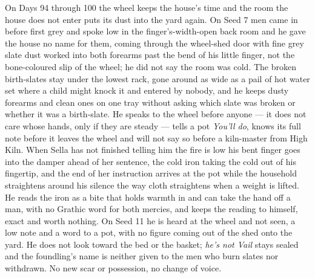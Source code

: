 \documentclass{design/chronicle}
\begin{document}
{On Days 94 through 100 the wheel keeps the house’s time and the room the house does not enter puts its dust into the yard again. On Seed 7 men came in before first grey and spoke low in the finger’s-width-open back room and he gave the house no name for them, coming through the wheel-shed door with fine grey slate dust worked into both forearms past the bend of his little finger, not the bone-coloured slip of the wheel; he did not say the room was cold. The broken birth-slates stay under the lowest rack, gone around as wide as a pail of hot water set where a child might knock it and entered by nobody, and he keeps dusty forearms and clean ones on one tray without asking which slate was broken or whether it was a birth-slate. He speaks to the wheel before anyone --- it does not care whose hands, only if they are steady --- tells a pot \emph{You’ll do}, knows its full note before it leaves the wheel and will not say so before a kiln-master from High Kiln. When Sella has not finished telling him the fire is low his bent finger goes into the damper ahead of her sentence, the cold iron taking the cold out of his fingertip, and the end of her instruction arrives at the pot while the household straightens around his silence the way cloth straightens when a weight is lifted. He reads the iron as a bite that holds warmth in and can take the hand off a man, with no Grathic word for both mercies, and keeps the reading to himself, exact and worth nothing. On Seed 11 he is heard at the wheel and not seen, a low note and a word to a pot, with no figure coming out of the shed onto the yard. He does not look toward the bed or the basket; \emph{he’s not Vail} stays sealed and the foundling’s name is neither given to the men who burn slates nor withdrawn. No new scar or possession, no change of voice.

}
\end{document}
